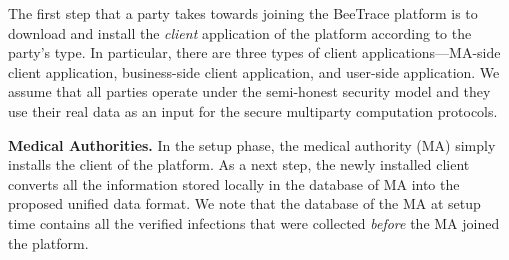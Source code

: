 \documentclass[11pt,dvipdfmx]{article}  %
\newcommand{\sysname}{\textsf{BeeTrace}\xspace}
\begin{document}


The first step that a party takes towards joining the \sysname platform is to download and install the \emph{client} application of the platform according to the party's type. In particular, there are three types of client applications---MA-side client application, business-side client application, and user-side application.
We assume that all parties operate under the semi-honest security model and they use their real data as an input for the secure multiparty computation protocols. 



\textbf{Medical Authorities. }In the setup phase, the medical authority (MA) simply installs the client of the platform. 
As a next step, the newly installed client converts all the information stored locally in the database of MA into the proposed unified data format. 
We note that the database of the MA at setup time contains all the verified infections that were collected \emph{before} the MA joined the platform.

\end{document}
